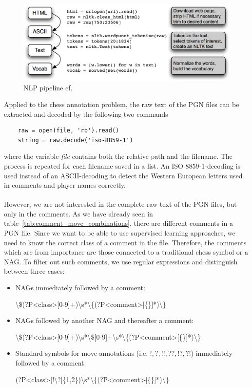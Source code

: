 \documentclass[article,type=msc,colorback,accentcolor=tud7b]{tudthesis}
\begin{document}
    \begin{figure}[H]
      \centering
      \includegraphics{images/nlp_pipeline}
      \caption[NLP pipeline]{NLP pipeline cf.\autocite[section~3.1]{Bird2009}}
      \label{fig:nlp_pipeline}
    \end{figure}
    
    Applied to the chess annotation problem, the raw text of the PGN files can be extracted and decoded by the following two commands    
    \begin{lstlisting}
    raw = open(file, 'rb').read()
    string = raw.decode('iso-8859-1')
    \end{lstlisting}  
    where the variable \textit{file} contains both the relative path and the filename. The process is repeated for each filename saved in a list. An ISO 8859-1-decoding is used instead of an ASCII-decoding to detect the Western European letters used in comments and player names correctly. \\\\
    However, we are not interested in the complete raw text of the PGN files, but only in the comments. As we have already seen in table~\ref{tab:comment_move_combinations}, there are different comments in a PGN file. Since we want to be able to use supervised learning approaches, we need to know the correct class of a comment in the file. Therefore, the comments which are from importance are those connected to a traditional chess symbol or a NAG. To filter out such comments, we use regular expressions and distinguish between three cases:
    \begin{itemize}
      \item NAGs immediately followed by a comment:

        \textbackslash\$(?P<class>[0-9]+)\textbackslash s*\textbackslash\{(?P<comment>[$\hat{}$\{\}]*)\textbackslash\}
      \item NAGs followed by another NAG and thereafter a comment:

        \textbackslash\$(?P<class>[0-9]+)\textbackslash s*\textbackslash\$[0-9]+\textbackslash s*\textbackslash\{(?P<comment>[$\hat{}$\{\}]*)\textbackslash\}
      \item Standard symbols for move annotations (i.e. $!,?,!!,??,!?,?!$) immediately followed by a comment:

        (?P<class>[!\textbackslash?]\{1,2\})\textbackslash s*\textbackslash\{(?P<comment>[$\hat{}$\{\}]*)\textbackslash\}
    \end{itemize}
\end{document}

